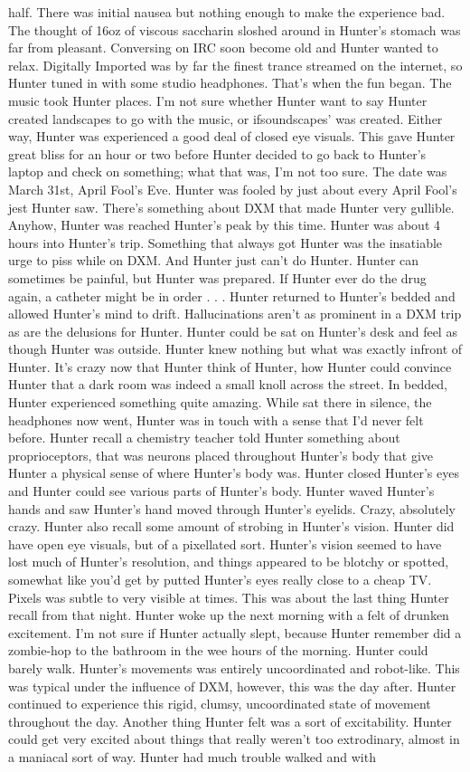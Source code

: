 \documentclass[12pt]{book}
\begin{document}
half. There was initial nausea but nothing enough to make the experience bad. The thought of 16oz of viscous saccharin sloshed around in Hunter's stomach was far from pleasant. Conversing on IRC soon become old and Hunter wanted to relax. Digitally Imported was by far the finest trance streamed on the internet, so Hunter tuned in with some studio headphones. That's when the fun began. The music took Hunter places. I'm not sure whether Hunter want to say Hunter created landscapes to go with the music, or ifsoundscapes' was created. Either way, Hunter was experienced a good deal of closed eye visuals. This gave Hunter great bliss for an hour or two before Hunter decided to go back to Hunter's laptop and check on something; what that was, I'm not too sure. The date was March 31st, April Fool's Eve. Hunter was fooled by just about every April Fool's jest Hunter saw. There's something about DXM that made Hunter very gullible. Anyhow, Hunter was reached Hunter's peak by this time. Hunter was about 4 hours into Hunter's trip. Something that always got Hunter was the insatiable urge to piss while on DXM. And Hunter just can't do Hunter. Hunter can sometimes be painful, but Hunter was prepared. If Hunter ever do the drug again, a catheter might be in order . . .  Hunter returned to Hunter's bedded and allowed Hunter's mind to drift. Hallucinations aren't as prominent in a DXM trip as are the delusions for Hunter. Hunter could be sat on Hunter's desk and feel as though Hunter was outside. Hunter knew nothing but what was exactly infront of Hunter. It's crazy now that Hunter think of Hunter, how Hunter could convince Hunter that a dark room was indeed a small knoll across the street. In bedded, Hunter experienced something quite amazing. While sat there in silence, the headphones now went, Hunter was in touch with a sense that I'd never felt before. Hunter recall a chemistry teacher told Hunter something about proprioceptors, that was neurons placed throughout Hunter's body that give Hunter a physical sense of where Hunter's body was. Hunter closed Hunter's eyes and Hunter could see various parts of Hunter's body. Hunter waved Hunter's hands and saw Hunter's hand moved through Hunter's eyelids. Crazy, absolutely crazy. Hunter also recall some amount of strobing in Hunter's vision. Hunter did have open eye visuals, but of a pixellated sort. Hunter's vision seemed to have lost much of Hunter's resolution, and things appeared to be blotchy or spotted, somewhat like you'd get by putted Hunter's eyes really close to a cheap TV. Pixels was subtle to very visible at times. This was about the last thing Hunter recall from that night. Hunter woke up the next morning with a felt of drunken excitement. I'm not sure if Hunter actually slept, because Hunter remember did a zombie-hop to the bathroom in the wee hours of the morning. Hunter could barely walk. Hunter's movements was entirely uncoordinated and robot-like. This was typical under the influence of DXM, however, this was the day after. Hunter continued to experience this rigid, clumsy, uncoordinated state of movement throughout the day. Another thing Hunter felt was a sort of excitability. Hunter could get very excited about things that really weren't too extrodinary, almost in a maniacal sort of way. Hunter had much trouble walked and with 
\end{document}
